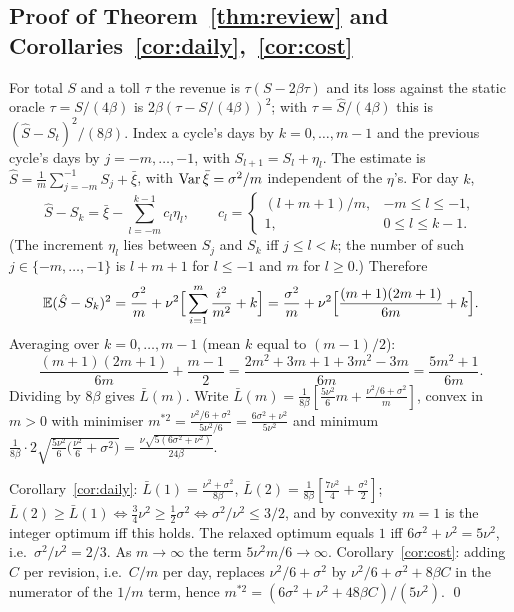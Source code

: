 \subsection{Proof of Theorem~\ref{thm:review} and Corollaries~\ref{cor:daily},~\ref{cor:cost}}
For total $S$ and a toll $\tau$ the revenue is $\tau(S-2\beta\tau)$ and its loss against the static oracle $\tau=S/(4\beta)$ is $2\beta(\tau-S/(4\beta))^2$; with $\tau=\hat S/(4\beta)$ this is $(\hat S-S_t)^2/(8\beta)$. Index a cycle's days by $k=0,\dots,m-1$ and the previous cycle's days by $j=-m,\dots,-1$, with $S_{l+1}=S_l+\eta_l$. The estimate is $\hat S=\frac1m\sum_{j=-m}^{-1}S_j+\bar\xi$, with $\operatorname{Var}\bar\xi=\sigma^2/m$ independent of the $\eta$'s. For day $k$,
\[\hat S-S_k=\bar\xi-\sum_{l=-m}^{k-1}c_l\eta_l,\qquad c_l=\begin{cases}(l+m+1)/m,&-m\le l\le-1,\\1,&0\le l\le k-1.\end{cases}\]
(The increment $\eta_l$ lies between $S_j$ and $S_k$ iff $j\le l<k$; the number of such $j\in\{-m,\dots,-1\}$ is $l+m+1$ for $l\le-1$ and $m$ for $l\ge0$.) Therefore
\[\mathbb{E}(\hat S-S_k)^2=\frac{\sigma^2}m+\nu^2\Big[\sum_{i=1}^m\frac{i^2}{m^2}+k\Big]=\frac{\sigma^2}m+\nu^2\Big[\frac{(m+1)(2m+1)}{6m}+k\Big].\]
Averaging over $k=0,\dots,m-1$ (mean $k$ equal to $(m-1)/2$):
\[\frac{(m+1)(2m+1)}{6m}+\frac{m-1}2=\frac{2m^2+3m+1+3m^2-3m}{6m}=\frac{5m^2+1}{6m}.\]
Dividing by $8\beta$ gives $\bar L(m)$. Write $\bar L(m)=\frac1{8\beta}[\frac{5\nu^2}{6}m+\frac{\nu^2/6+\sigma^2}{m}]$, convex in $m>0$ with minimiser $m^{*2}=\frac{\nu^2/6+\sigma^2}{5\nu^2/6}=\frac{6\sigma^2+\nu^2}{5\nu^2}$ and minimum $\frac1{8\beta}\cdot2\sqrt{\frac{5\nu^2}6\big(\frac{\nu^2}6+\sigma^2\big)}=\frac{\nu\sqrt{5(6\sigma^2+\nu^2)}}{24\beta}$.

Corollary~\ref{cor:daily}: $\bar L(1)=\frac{\nu^2+\sigma^2}{8\beta}$, $\bar L(2)=\frac1{8\beta}[\frac{7\nu^2}4+\frac{\sigma^2}2]$; $\bar L(2)\ge\bar L(1)\iff\frac34\nu^2\ge\frac12\sigma^2\iff\sigma^2/\nu^2\le3/2$, and by convexity $m=1$ is the integer optimum iff this holds. The relaxed optimum equals $1$ iff $6\sigma^2+\nu^2=5\nu^2$, i.e.\ $\sigma^2/\nu^2=2/3$. As $m\to\infty$ the term $5\nu^2m/6\to\infty$. Corollary~\ref{cor:cost}: adding $C$ per revision, i.e.\ $C/m$ per day, replaces $\nu^2/6+\sigma^2$ by $\nu^2/6+\sigma^2+8\beta C$ in the numerator of the $1/m$ term, hence $m^{*2}=(6\sigma^2+\nu^2+48\beta C)/(5\nu^2)$. \qed

